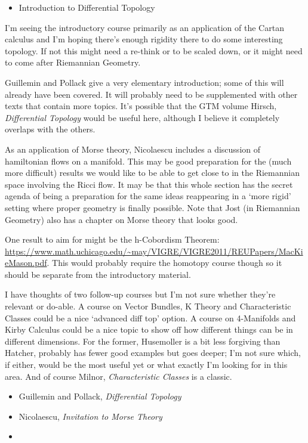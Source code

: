\documentclass[article]{article}
\begin{document}
\begin{itemize}
	\item{Introduction to Differential Topology}
\end{itemize}

I'm seeing the introductory course primarily as an application of the Cartan calculus and I'm hoping there's enough rigidity there to do some interesting topology. If not this might need a re-think or to be scaled down, or it might need to come after Riemannian Geometry.

Guillemin and Pollack give a very elementary introduction; some of this will already have been covered. It will probably need to be supplemented with other texts that contain more topics. It's possible that the GTM volume Hirsch, \textit{Differential Topology} would be useful here, although I believe it completely overlaps with the others.

As an application of Morse theory, Nicolaescu includes a discussion of hamiltonian flows on a manifold. This may be good preparation for the (much more difficult) results we would like to be able to get close to in the Riemannian space involving the Ricci flow. It may be that this whole section has the secret agenda of being a preparation for the same ideas reappearing in a `more rigid' setting where proper geometry is finally possible. Note that Jost (in Riemannian Geometry) also has a chapter on Morse theory that looks good.

One result to aim for might be the h-Cobordism Theorem: \url{https://www.math.uchicago.edu/~may/VIGRE/VIGRE2011/REUPapers/MacKieMason.pdf}. This would probably require the homotopy course though so it should be separate from the introductory material.

I have thoughts of two follow-up courses but I'm not sure whether they're relevant or do-able. A course on Vector Bundles, K Theory and Characteristic Classes could be a nice `advanced diff top' option. A course on 4-Manifolds and Kirby Calculus could be a nice topic to show off how different things can be in different dimensions. For the former, Husemoller is a bit less forgiving than Hatcher, probably has fewer good examples but goes deeper; I'm not sure which, if either, would be the most useful yet or what exactly I'm looking for in this area. And of course Milnor, \textit{Characteristic Classes} is a classic.

\begin{itemize}
	\item[]{Guillemin and Pollack, \textit{Differential Topology}}
	\item[]{Nicolaescu, \textit{Invitation to Morse Theory}}
	\item 
\end{itemize}
\end{document}
